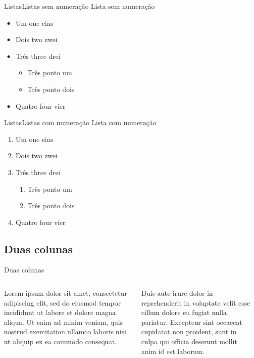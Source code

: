\documentclass[
brazilian, %
12pt, %
]{beamer}
\begin{document}
	\begin{frame}{Listas}{Listas sem numeração}
		Lista sem numeração
		
		\begin{itemize}
			\item Um one eins
			\item Dois two zwei
			\item Três three drei
			\begin{itemize}
				\item Três ponto um
				\item Três ponto dois
			\end{itemize}
			\item Quatro four vier
		\end{itemize}
	\end{frame}
	
	\begin{frame}{Listas}{Listas com numeração}
		Lista com numeração
		
		\begin{enumerate}
			\item Um one eins
			\item Dois two zwei
			\item Três three drei
			\begin{enumerate}
				\item Três ponto um
				\item Três ponto dois
			\end{enumerate}
			\item Quatro four vier
		\end{enumerate}
	\end{frame}
	
	\subsection{Duas colunas}
	
	\begin{frame}{Duas colunas}
		\begin{columns}[t]
			\begin{column}{0.4\linewidth}
				Lorem ipsum dolor sit amet, consectetur adipiscing elit, sed do eiusmod tempor incididunt ut labore et dolore magna aliqua. Ut enim ad minim veniam, quis nostrud exercitation ullamco laboris nisi ut aliquip ex ea commodo consequat.
			\end{column}
			\begin{column}{0.6\linewidth}
				Duis aute irure dolor in reprehenderit in voluptate velit esse cillum dolore eu fugiat nulla pariatur. Excepteur sint occaecat cupidatat non proident, sunt in culpa qui officia deserunt mollit anim id est laborum.
			\end{column}
		\end{columns}
	\end{frame}
	
\end{document}
